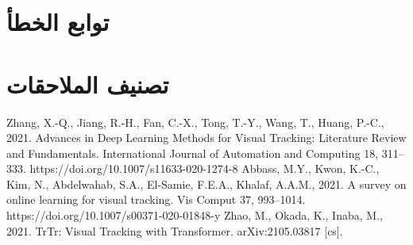\documentclass[a4paper,1  pt]{report}
\begin{document}
\section{توابع الخطأ}

\section{تصنيف الملاحقات}

\begin{thebibliography}{ widest-label }
\label{Zhang et al., 2021}
Zhang, X.-Q., Jiang, R.-H., Fan, C.-X., Tong, T.-Y., Wang, T., Huang, P.-C., 2021. Advances in Deep Learning Methods for Visual Tracking: Literature Review and Fundamentals. International Journal of Automation and Computing 18, 311–333. https://doi.org/10.1007/s11633-020-1274-8
Abbass, M.Y., Kwon, K.-C., Kim, N., Abdelwahab, S.A., El-Samie, F.E.A., Khalaf, A.A.M., 2021. A survey on online learning for visual tracking. Vis Comput 37, 993–1014. https://doi.org/10.1007/s00371-020-01848-y
Zhao, M., Okada, K., Inaba, M., 2021. TrTr: Visual Tracking with Transformer. arXiv:2105.03817 [cs].

\end{thebibliography}
\end{document}
